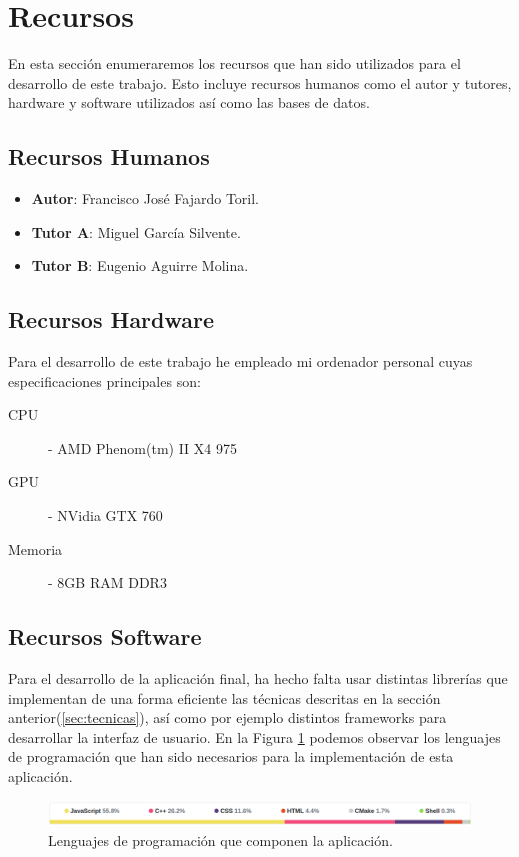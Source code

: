 \documentclass[a4paper,11pt]{book}
\newcommand{\myName}{Francisco José Fajardo Toril\xspace}
\newcommand{\myProf}{Miguel García Silvente\xspace}
\newcommand{\myOtherProf}{Eugenio Aguirre Molina\xspace}
\begin{document}
\section{Recursos}
En esta sección enumeraremos los recursos que han sido utilizados para el desarrollo de este trabajo. Esto incluye recursos humanos como el autor y tutores, hardware y software utilizados así como las bases de datos.
\subsection{Recursos Humanos}
\begin{itemize}
	\item \textbf{Autor}: \myName.
	\item \textbf{Tutor A}: \myProf.
	\item \textbf{Tutor B}: \myOtherProf.
\end{itemize}
\subsection{Recursos Hardware}
Para el desarrollo de este trabajo he empleado mi ordenador personal cuyas especificaciones principales son:
\begin{description}
	\item [CPU] - AMD Phenom(tm) II X4 975
	\item [GPU] - NVidia GTX 760
	\item [Memoria] - 8GB RAM DDR3
\end{description}
\subsection{Recursos Software}\label{sub:software}
Para el desarrollo de la aplicación final, ha hecho falta usar distintas librerías que implementan de una forma eficiente las técnicas descritas en la sección anterior(\ref{sec:tecnicas}), así como por ejemplo distintos frameworks para desarrollar la interfaz de usuario. En la Figura \ref{fig:programming_languages} podemos observar los lenguajes de programación que han sido necesarios para la implementación de esta aplicación.
\\
\begin{figure}[h]
	\centering
	\includegraphics[width=1.0\linewidth]{imagenes/programming_languages}
	\caption[Lenguajes de programación]{Lenguajes de programación que componen la aplicación\cite{franft}.}
	\label{fig:programming_languages}
\end{figure}
\end{document}
